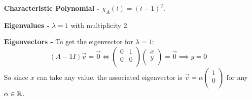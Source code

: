 \documentclass[../main.tex]{subfiles}
\begin{document}
\begin{example}
\begin{enumerate}
      \textbf{Characteristic Polynomial -} $\chi_A(t) = (t - 1)^2$.\par
      \textbf{Eigenvalues -} $\lambda  = 1$ with multiplicity 2.\par
      \textbf{Eigenvectors -} To get the eigenvector for $\lambda = 1$:
      \[
        (A - 1I)\vec{v} = \vec{0}  \iff \begin{pmatrix}
        0 & 1 \\
        0 & 0 \\
        \end{pmatrix}
        \begin{pmatrix}
        x \\
        y \\
        \end{pmatrix} = \vec{0} \implies y = 0
      \]
      So since $x$ can take any value, the associated eigenvector is $\vec{v} = \alpha \begin{pmatrix}
      1 \\
      0 \\
      \end{pmatrix}$ for any $\alpha \in \mathbb{R}$.
  \end{enumerate}
\end{example}
\end{document}
